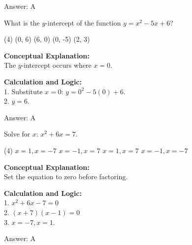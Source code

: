 \documentclass[11pt,paper=a4,answers]{exam}
\begin{document}
\begin{questions}
\begin{solution}
Answer: \colorbox{yellow!100}{A}
\end{solution}

\vspace{30pt}

\question
What is the $y$-intercept of the function $y = x^2 - 5x + 6$?
\begin{tasks}(4)
    \task (0, 6)
    \task (6, 0)
    \task (0, -5)
    \task (2, 3)
\end{tasks}

\begin{solution}
\textbf{Conceptual Explanation:} \\
The $y$-intercept occurs where $x = 0$.

\vspace{15pt}

\textbf{Calculation and Logic:} \\
1. Substitute $x = 0$: $y = 0^2 - 5(0) + 6$. \\
2. $y = 6$.

\vspace{20pt}

Answer: \colorbox{yellow!100}{A}
\end{solution}

\vspace{30pt}

\question
Solve for $x$: $x^2 + 6x = 7$.
\begin{tasks}(4)
    \task $x = 1, x = -7$
    \task $x = -1, x = 7$
    \task $x = 1, x = 7$
    \task $x = -1, x = -7$
\end{tasks}

\begin{solution}
\textbf{Conceptual Explanation:} \\
Set the equation to zero before factoring.

\vspace{15pt}

\textbf{Calculation and Logic:} \\
1. $x^2 + 6x - 7 = 0$ \\
2. $(x + 7)(x - 1) = 0$ \\
3. $x = -7, x = 1$.

\vspace{20pt}

Answer: \colorbox{yellow!100}{A}
\end{solution}


\end{questions}
\end{document}
